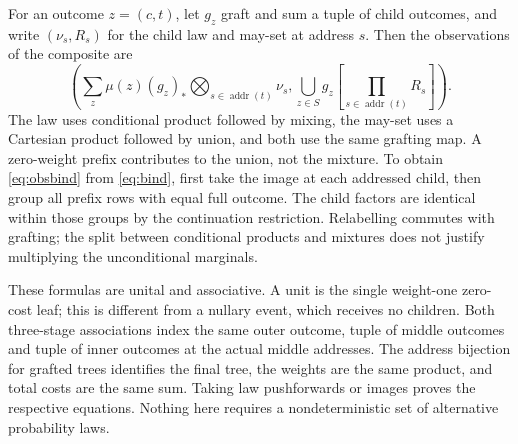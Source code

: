 \documentclass[11pt]{article}
\theoremstyle{definition}
\newcommand{\Addr}{\operatorname{addr}}
\begin{document}
For an outcome $z=(c,t)$, let $g_z$ graft and sum a tuple of child
outcomes, and write $(\nu_s,R_s)$ for the child law and may-set at
address $s$. Then the observations of the composite are
\[
 \left(\sum_z \mu(z)(g_z)_*\!\bigotimes_{s\in\Addr(t)}\nu_s,       \bigcup_{z\in S}g_z\!\left[\prod_{s\in\Addr(t)}R_s\right]\right).
 \tag{3}\label{eq:obsbind}
\]
The law uses conditional product followed by mixing, the may-set
uses a Cartesian product followed by union, and both use the same
grafting map. A zero-weight prefix contributes to the union, not the
mixture. To obtain \eqref{eq:obsbind} from \eqref{eq:bind}, first
take the image at each addressed child, then group all prefix rows
with equal full outcome. The child factors are identical within
those groups by the continuation restriction. Relabelling commutes
with grafting; the split between conditional products and mixtures
does not justify multiplying the unconditional marginals.

These formulas are unital and associative. A unit is the single
weight-one zero-cost leaf; this is different from a nullary event,
which receives no children. Both three-stage associations index the
same outer outcome, tuple of middle outcomes and tuple of inner
outcomes at the actual middle addresses. The address bijection for
grafted trees identifies the final tree, the weights are the same
product, and total costs are the same sum. Taking law pushforwards or
images proves the respective equations. Nothing here requires a
nondeterministic set of alternative probability laws.
\end{document}
